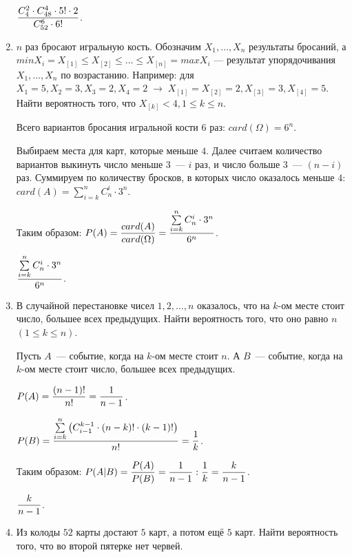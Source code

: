 \documentclass{article}
\begin{document}
\begin{enumerate}
    \answer{} $\displaystyle{\frac{C_4^2 \cdot C_{48}^{4} \cdot 5! \cdot 2}{C_{52}^6 \cdot 6!}}$.

    \item $n$ раз бросают игральную кость. Обозначим $X_1, \ldots, X_n$ результаты бросаний, а $min X_i = X_{[1]} \leq X_{[2]} \leq \ldots \leq X_{[n]} = max X_i$ — результат упорядочивания $X_1, \ldots, X_n$ по возрастанию. Например: для $X_1 = 5, X_2 = 3, X_3 = 2, X_4 = 2 \; \rightarrow \; X_{[1]} = X_{[2]} = 2, X_{[3]} = 3, X_{[4]} = 5$. Найти вероятность того, что $X_{[k]} < 4, 1 \leq k \leq n$.

    \solution{}

    Всего вариантов бросания игральной кости $6$ раз: $card(\Omega) = 6 ^ n$.

    Выбираем места для карт, которые меньше $4$. Далее считаем количество вариантов выкинуть число меньше $3$~--- $i$ раз, и число больше $3$~--- $(n − i)$ раз. Суммируем по количеству бросков, в которых число оказалось меньше $4$: $card(A) = \sum\limits_{i = k}^n C_n^i \cdot 3 ^ n$.

    Таким образом: $\displaystyle{P(A) = \frac{card(A)}{card(\Omega)} = \frac{\sum\limits_{i = k}^n C_n^i \cdot 3 ^ n}{6 ^ n}}$.

    \answer{} $\displaystyle{\frac{\sum\limits_{i = k}^n C_n^i \cdot 3 ^ n}{6 ^ n}}$.

    \item В случайной перестановке чисел $1, 2, \ldots, n$ оказалось, что на $k$-ом месте стоит число, большее всех предыдущих. Найти вероятность того, что оно равно $n$ $(1 \leq k \leq n)$.

    \solution{}

    Пусть $A$~--- событие, когда на $k$-ом месте стоит $n$. А $B$~--- событие, когда на $k$-ом месте стоит число, большее всех предыдущих.

    $\displaystyle{P(A) = \frac{(n - 1)!}{n!}} = \frac{1}{n - 1}$.

    $\displaystyle{P(B) = \frac{\sum\limits_{i = k}^{n} \left( C_{i - 1}^{k - 1} \cdot (n - k)! \cdot (k - 1)! \right)}{n!}} = \frac{1}{k}$.

    Таким образом: $\displaystyle{P(A|B) = \frac{P(A)}{P(B)} = \frac{1}{n - 1} : \frac{1}{k} = \frac{k}{n - 1}}$.

    \answer{} $\displaystyle{\frac{k}{n - 1}}$.

    \item Из колоды $52$ карты достают $5$ карт, а потом ещё $5$ карт. Найти вероятность того, что во второй пятерке нет червей.


\end{enumerate}
\end{document}
